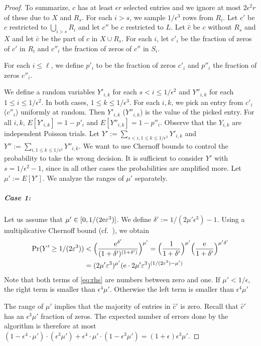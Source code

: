 \begin{proof}
    To summarize, $c$ has at least $\epsilon r$ selected entries and we ignore at most $2 \epsilon^2 r$ of these due to $X$ and $R_s$.
    For each $i > s$, we sample $1/\epsilon^3$ rows from $R_i$. 
    Let $c'$ be $c$ restricted to $\bigcup_{i > s} R_{i}$ and let $c''$ be $c$ restricted to  $L$.
    Let $\hat{c}$ be $c$ without $R_s$ and $X$ and let $\bar{c}$ be the part of $c$ in $X \cup R_s$.
    For each $i$, let $c'_i$ be the fraction of zeros of $c'$ in $R_i$ and $c''_i$ the fraction of zeros of $c''$ in $S_i$.

    For each $i \le \ell$, we define $p'_i$ to be the fraction of zeros $c'_i$ and $p''_i$ the fraction of zeros $c''_i$.

    We define a random variables $Y'_{i,k}$ for each $s < i \le 1/\epsilon^2$ and $Y''_{i,k}$ for each $1 \le i \le 1/\epsilon^2$. 
    In both cases, $1 \le k \le 1/\epsilon^3$.
    For each $i,k$, we pick an entry from $c'_{i}$ ($c''_i$) uniformly at random. 
    Then $Y'_{i,k}$ ($Y''_{i,k}$) is the value of the picked entry.
    For all $i,k$, $E[Y'_{i,k}] = 1 - p'_{i}$ and $E[Y''_{i,k}] = 1 - p''_i$. 
    Observe that the $Y_{i,k}$ are independent Poisson trials.
    Let $Y' := \sum_{s<i ,1 \le k \le 1/\epsilon^3} Y'_{i,k}$ 
    and $Y'':= \sum_{i, 1 \le k \le 1/\epsilon^3} Y''_{i,k}$.
    We want to use Chernoff bounds to control the probability to take the wrong decision.
    It is sufficient to consider $Y'$ with $s = 1/\epsilon^2-1$, since in all other cases the probabilities are amplified more.
    Let $\mu' := E[Y']$.
    We analyze the ranges of $\mu'$ separately.
    \subparagraph{Case 1:} Let us assume that $\mu' \in [0,1/(2\textrm{e}\varepsilon^3)]$.
    We define $\delta' := 1/(2\mu'\epsilon^3) - 1$.
    Using a multiplicative Chernoff bound (cf.~\cite{MU05_probability}), we obtain
    \begin{align}
        \Pr(Y' \ge 1/(2\varepsilon^3)) &< \Bigl(\frac{\textrm{e}^{\delta'}}{(1+\delta')^{(1+\delta')}}\Bigr)^{\mu'} = \Bigl(\frac{1}{1 + \delta'}\Bigr)^{\mu'} \Bigl(\frac{\textrm{e}}{{1 + \delta'}}\Bigr)^{\mu'\delta'}\\
        &= (2 \mu' \varepsilon^3)^{\mu'}(\textrm{e} \cdot 2\mu'\varepsilon^3)^{(1/(2\varepsilon^3)  - \mu')}\label{eq:rhs}
    \end{align}
    Note that both terms of \eqref{eq:rhs} are numbers between zero and one.
    If $\mu' < 1/\epsilon$, the right term is smaller than $\epsilon^4 \mu'$. 
    Otherwise the left term is smaller than $\epsilon^4 \mu'$

    The range of $\mu'$ implies that the majority of entries in $\hat{c}'$ is zero.
    Recall that $\hat{c}'$ has an $\epsilon^3 \mu'$ fraction of zeros.
    The expected number of errors done by the algorithm is therefore at most
    $(1 - \epsilon^4 \cdot \mu') \cdot (\epsilon^3 \mu') + \epsilon^4 \cdot \mu' \cdot (1 - \epsilon^3 \mu') = (1+\epsilon) \epsilon^3 \mu'$.


\end{proof}
